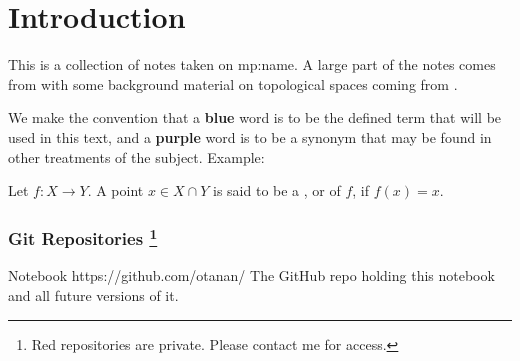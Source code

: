 \chapter*{Introduction}
This is a collection of notes taken on {mp:name}. A large part of
the notes comes from \cite{lee2013smooth} with some background material on
topological spaces coming from \cite{munkres2000topology}.

We make the convention that a \textbf{\textcolor{jd_blue}{blue}} word is
to be the defined term that will be used in this text, and a
\textbf{\textcolor{jd_purple}{purple}} word is to be a synonym that may be 
found in other treatments of the subject. Example:
\begin{define*}
    Let $f: X \to Y$. A point $x \in X \cap Y$ is said to be a
    , or  of $f$, if
    $f(x) = x$.
\end{define*}


\subsection*{Git Repositories%
    \footnote{Red repositories are private. Please contact me for access.}
}

\begin{privaterepo}{Notebook}
{https://github.com/otanan/}
    The GitHub repo holding this notebook and all future versions of it.  
\end{privaterepo}

